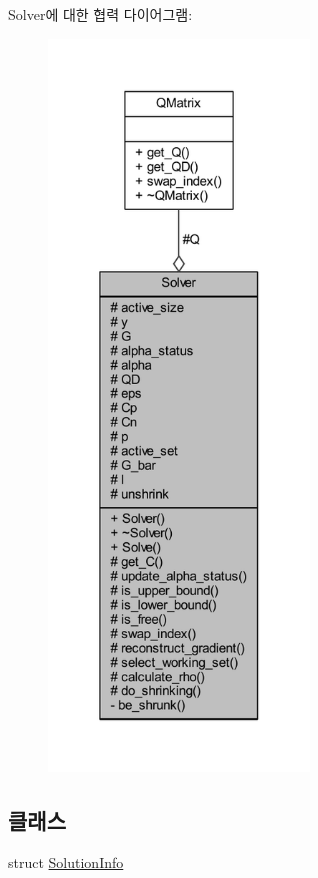 Solver에 대한 협력 다이어그램\+:
\nopagebreak
\begin{figure}[H]
\begin{center}
\leavevmode
\includegraphics[height=550pt]{class_solver__coll__graph}
\end{center}
\end{figure}
\subsection*{클래스}
\begin{DoxyCompactItemize}
\item 
struct \hyperlink{struct_solver_1_1_solution_info}{Solution\+Info}
\end{DoxyCompactItemize}
